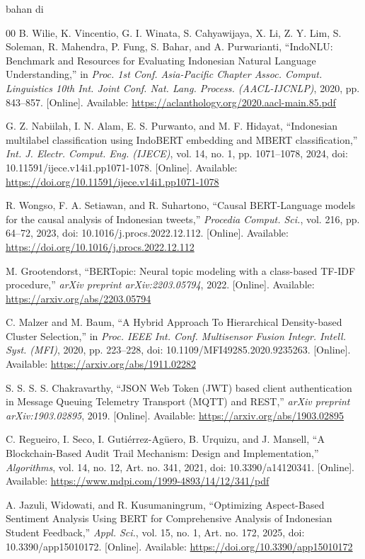 bahan di\documentclass[conference]{IEEEtran}
\begin{document}
\begin{thebibliography}{00}
B. Wilie, K. Vincentio, G. I. Winata, S. Cahyawijaya, X. Li, Z. Y. Lim, S. Soleman, R. Mahendra, P. Fung, S. Bahar, and A. Purwarianti, ``IndoNLU: Benchmark and Resources for Evaluating Indonesian Natural Language Understanding,'' in \textit{Proc. 1st Conf. Asia-Pacific Chapter Assoc. Comput. Linguistics 10th Int. Joint Conf. Nat. Lang. Process. (AACL-IJCNLP)}, 2020, pp. 843--857. [Online]. Available: \url{https://aclanthology.org/2020.aacl-main.85.pdf}

G. Z. Nabiilah, I. N. Alam, E. S. Purwanto, and M. F. Hidayat, ``Indonesian multilabel classification using IndoBERT embedding and MBERT classification,'' \textit{Int. J. Electr. Comput. Eng. (IJECE)}, vol. 14, no. 1, pp. 1071--1078, 2024, doi: 10.11591/ijece.v14i1.pp1071-1078. [Online]. Available: \url{https://doi.org/10.11591/ijece.v14i1.pp1071-1078}

R. Wongso, F. A. Setiawan, and R. Suhartono, ``Causal BERT-Language models for the causal analysis of Indonesian tweets,'' \textit{Procedia Comput. Sci.}, vol. 216, pp. 64--72, 2023, doi: 10.1016/j.procs.2022.12.112. [Online]. Available: \url{https://doi.org/10.1016/j.procs.2022.12.112}

M. Grootendorst, ``BERTopic: Neural topic modeling with a class-based TF-IDF procedure,'' \textit{arXiv preprint arXiv:2203.05794}, 2022. [Online]. Available: \url{https://arxiv.org/abs/2203.05794}

C. Malzer and M. Baum, ``A Hybrid Approach To Hierarchical Density-based Cluster Selection,'' in \textit{Proc. IEEE Int. Conf. Multisensor Fusion Integr. Intell. Syst. (MFI)}, 2020, pp. 223--228, doi: 10.1109/MFI49285.2020.9235263. [Online]. Available: \url{https://arxiv.org/abs/1911.02282}

S. S. S. S. Chakravarthy, ``JSON Web Token (JWT) based client authentication in Message Queuing Telemetry Transport (MQTT) and REST,'' \textit{arXiv preprint arXiv:1903.02895}, 2019. [Online]. Available: \url{https://arxiv.org/abs/1903.02895}

C. Regueiro, I. Seco, I. Gutiérrez-Agüero, B. Urquizu, and J. Mansell, ``A Blockchain-Based Audit Trail Mechanism: Design and Implementation,'' \textit{Algorithms}, vol. 14, no. 12, Art. no. 341, 2021, doi: 10.3390/a14120341. [Online]. Available: \url{https://www.mdpi.com/1999-4893/14/12/341/pdf}

A. Jazuli, Widowati, and R. Kusumaningrum, ``Optimizing Aspect-Based Sentiment Analysis Using BERT for Comprehensive Analysis of Indonesian Student Feedback,'' \textit{Appl. Sci.}, vol. 15, no. 1, Art. no. 172, 2025, doi: 10.3390/app15010172. [Online]. Available: \url{https://doi.org/10.3390/app15010172}


\end{thebibliography}
\end{document}
